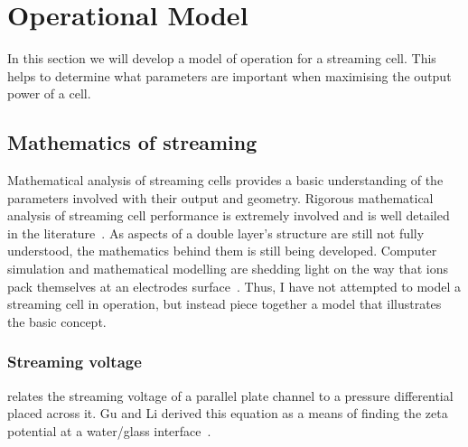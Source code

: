
\section{Operational Model}

In this section we will develop a model of operation for a streaming cell.
This helps to determine what parameters are important when maximising the output power of a cell.

\subsection{Mathematics of streaming}

Mathematical analysis of streaming cells provides a basic understanding of the parameters involved with their output and geometry.
Rigorous mathematical analysis of streaming cell performance is extremely involved and is well detailed in the literature~\cite{Yang1998}.
As aspects of a double layer's structure are still not fully understood, the mathematics behind them is still being developed.
Computer simulation and mathematical modelling are shedding light on the way that ions pack themselves at an electrodes surface~\cite{Kornyshev2007}.
Thus, I have not attempted to model a streaming cell in operation, but instead piece together a model that illustrates the basic concept.

\subsubsection*{Streaming voltage}
 relates the streaming voltage of a parallel plate channel to a pressure differential placed across it.
Gu and Li derived this equation as a means of finding the zeta potential at a water/glass interface~\cite{Gu2000a}.


